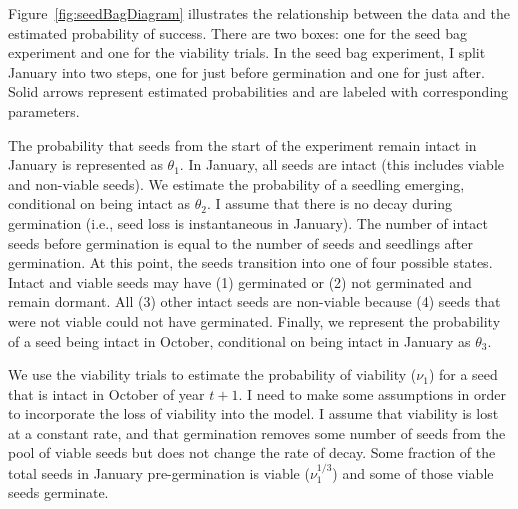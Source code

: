\documentclass[12pt, oneside, titlepage]{article}   	%
\begin{document}
Figure~\ref{fig:seedBagDiagram} illustrates the relationship between the data and the estimated probability of success. There are two boxes: one for the seed bag experiment and one for the viability trials. In the seed bag experiment, I split January into two steps, one for just before germination and one for just after. Solid arrows represent estimated probabilities and are labeled with corresponding parameters.
 
The probability that seeds from the start of the experiment remain intact in January is represented as $\theta_1$. In January, all seeds are intact (this includes viable and non-viable seeds). We estimate the probability of a seedling emerging, conditional on being intact as $\theta_2$. I assume that there is no decay during germination (i.e., seed loss is instantaneous in January). The number of intact seeds before germination is equal to the number of seeds and seedlings after germination. At this point, the seeds transition into one of four possible states. Intact and viable seeds may have (1) germinated or (2) not germinated and remain dormant. All (3) other intact seeds are non-viable because (4) seeds that were not viable could not have germinated. Finally, we represent the probability of a seed being intact in October, conditional on being intact in January as $\theta_3$.


We use the viability trials to estimate the probability of viability ($\nu_1$) for a seed that is intact in October of year $t+1$. I need to make some assumptions in order to incorporate the loss of viability into the model. I assume that viability is lost at a constant rate, and that germination removes some number of seeds from the pool of viable seeds but does not change the rate of decay. Some fraction of the total seeds in January pre-germination is viable ($\nu_1^{1/3}$) and some of those viable seeds germinate. 
\end{document}
